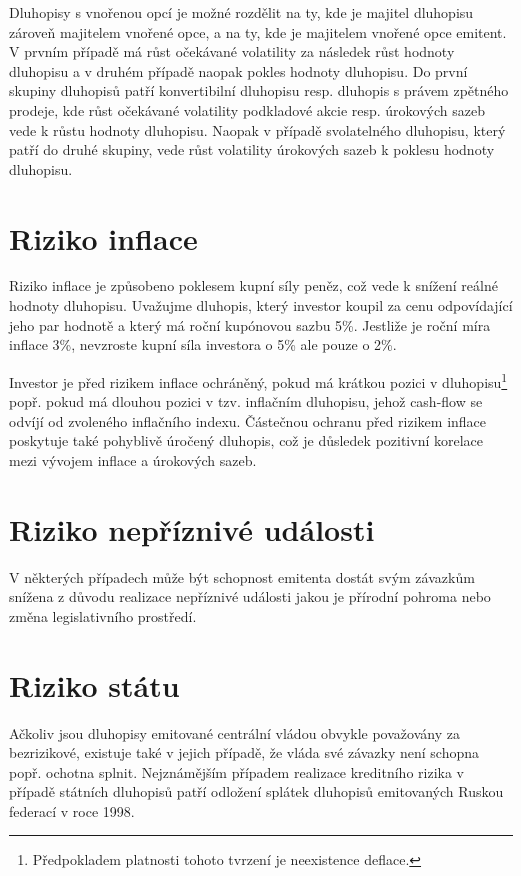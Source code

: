 \documentclass[a4paper]{book}
\begin{document}
Dluhopisy s vnořenou opcí je možné rozdělit na ty, kde je majitel dluhopisu zároveň majitelem vnořené opce, a na ty, kde je majitelem vnořené opce emitent. V prvním případě má růst očekávané volatility za následek růst hodnoty dluhopisu a v druhém případě naopak pokles hodnoty dluhopisu. Do první skupiny dluhopisů patří konvertibilní dluhopisu resp. dluhopis s právem zpětného prodeje, kde růst očekávané volatility podkladové akcie resp. úrokových sazeb vede k růstu hodnoty dluhopisu. Naopak v případě svolatelného dluhopisu, který patří do druhé skupiny, vede růst volatility úrokových sazeb k poklesu hodnoty dluhopisu.

\section{Riziko inflace}

Riziko inflace je způsobeno poklesem kupní síly peněz, což vede k snížení reálné hodnoty dluhopisu. Uvažujme dluhopis, který investor koupil za cenu odpovídající jeho par hodnotě a který má roční kupónovou sazbu 5\%. Jestliže je roční míra inflace 3\%, nevzroste kupní síla investora o 5\% ale pouze o 2\%.

Investor je před rizikem inflace ochráněný, pokud má krátkou pozici v dluhopisu\footnote{Předpokladem platnosti tohoto tvrzení je neexistence deflace.} popř. pokud má dlouhou pozici v tzv. inflačním dluhopisu, jehož cash-flow se odvíjí od zvoleného inflačního indexu. Částečnou ochranu před rizikem inflace poskytuje také pohyblivě úročený dluhopis, což je důsledek pozitivní korelace mezi vývojem inflace a úrokových sazeb.

\section{Riziko nepříznivé události}

V některých případech může být schopnost emitenta dostát svým závazkům snížena z důvodu realizace nepříznivé události jakou je přírodní pohroma nebo změna legislativního prostředí.

\section{Riziko státu}

Ačkoliv jsou dluhopisy emitované centrální vládou obvykle považovány za bezrizikové, existuje také v jejich případě, že vláda své závazky není schopna popř. ochotna splnit. Nejznámějším případem realizace kreditního rizika v případě státních dluhopisů patří odložení splátek dluhopisů emitovaných Ruskou federací v roce 1998.
\end{document}

